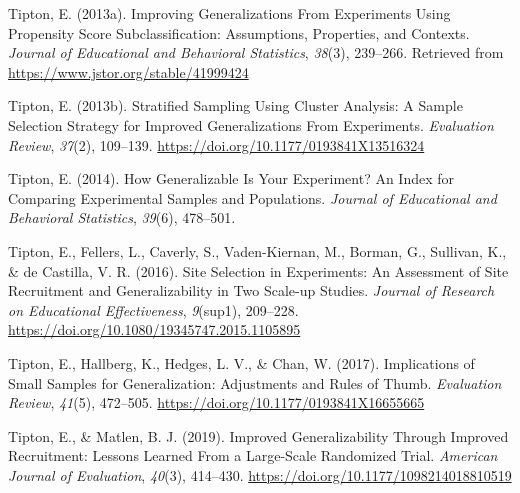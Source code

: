 \documentclass[
  english,
  man,floatsintext]{apa6}
\begin{document}
\leavevmode\hypertarget{ref-tiptonImprovingGeneralizationsExperiments2013}{}%
Tipton, E. (2013a). Improving Generalizations From Experiments Using Propensity Score Subclassification: Assumptions, Properties, and Contexts. \emph{Journal of Educational and Behavioral Statistics}, \emph{38}(3), 239--266. Retrieved from \url{https://www.jstor.org/stable/41999424}

\leavevmode\hypertarget{ref-tiptonStratifiedSamplingUsing2013}{}%
Tipton, E. (2013b). Stratified Sampling Using Cluster Analysis: A Sample Selection Strategy for Improved Generalizations From Experiments. \emph{Evaluation Review}, \emph{37}(2), 109--139. \url{https://doi.org/10.1177/0193841X13516324}

\leavevmode\hypertarget{ref-tiptonHowGeneralizableYour2014}{}%
Tipton, E. (2014). How Generalizable Is Your Experiment? An Index for Comparing Experimental Samples and Populations. \emph{Journal of Educational and Behavioral Statistics}, \emph{39}(6), 478--501.

\leavevmode\hypertarget{ref-tiptonSiteSelectionExperiments2016}{}%
Tipton, E., Fellers, L., Caverly, S., Vaden-Kiernan, M., Borman, G., Sullivan, K., \& de Castilla, V. R. (2016). Site Selection in Experiments: An Assessment of Site Recruitment and Generalizability in Two Scale-up Studies. \emph{Journal of Research on Educational Effectiveness}, \emph{9}(sup1), 209--228. \url{https://doi.org/10.1080/19345747.2015.1105895}

\leavevmode\hypertarget{ref-tiptonImplicationsSmallSamples2017}{}%
Tipton, E., Hallberg, K., Hedges, L. V., \& Chan, W. (2017). Implications of Small Samples for Generalization: Adjustments and Rules of Thumb. \emph{Evaluation Review}, \emph{41}(5), 472--505. \url{https://doi.org/10.1177/0193841X16655665}

\leavevmode\hypertarget{ref-tiptonImprovedGeneralizabilityImproved2019}{}%
Tipton, E., \& Matlen, B. J. (2019). Improved Generalizability Through Improved Recruitment: Lessons Learned From a Large-Scale Randomized Trial. \emph{American Journal of Evaluation}, \emph{40}(3), 414--430. \url{https://doi.org/10.1177/1098214018810519}

\endgroup
\end{document}
